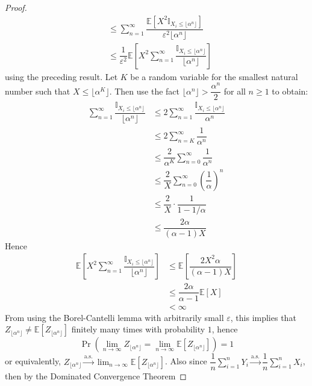 \documentclass[11pt]{report} %
\begin{document}
\begin{proof}
\begin{align}
&\leq \sum_{n = 1}^{\infty}\dfrac{\mathbb{E}\left[X^{2}\mathbb{I}_{X_{i} \leq \lfloor \alpha^{n} \rfloor}\right]}{\varepsilon^{2}\lfloor \alpha^{n} \rfloor} \\
&\leq \dfrac{1}{\varepsilon^{2}}\mathbb{E}\left[X^{2}\sum_{n = 1}^{\infty}\dfrac{\mathbb{I}_{X_{i} \leq \lfloor \alpha^{n} \rfloor}}{\lfloor \alpha^{n} \rfloor}\right]
\end{align}
using the preceding result. Let $K$ be a random variable for the smallest natural number such that $X \leq \lfloor \alpha^{K} \rfloor$. Then use the fact $\lfloor \alpha^{n} \rfloor > \dfrac{\alpha^{n}}{2}$ for all $n \geq 1$ to obtain:
\begin{align}
\sum_{n = 1}^{\infty}\dfrac{\mathbb{I}_{X_{i} \leq \lfloor \alpha^{n} \rfloor}}{\lfloor \alpha^{n} \rfloor} &\leq 2\sum_{n = 1}^{\infty}\dfrac{\mathbb{I}_{X_{i} \leq \lfloor \alpha^{n} \rfloor}}{\alpha^{n}} \\
&\leq 2\sum_{n = K}^{\infty}\dfrac{1}{\alpha^{n}} \\
&\leq \dfrac{2}{\alpha^{K}}\sum_{n = 0}^{\infty}\dfrac{1}{\alpha^{n}} \\
&\leq \dfrac{2}{X}\sum_{n = 0}^{\infty}\left(\dfrac{1}{\alpha}\right)^{n} \\
&\leq \dfrac{2}{X}\cdot\dfrac{1}{1 - 1/\alpha} \\
&\leq \dfrac{2\alpha}{\left(\alpha - 1\right)X}
\end{align}
Hence
\begin{align}
\mathbb{E}\left[X^{2}\sum_{n = 1}^{\infty}\dfrac{\mathbb{I}_{X_{i} \leq \lfloor \alpha^{n} \rfloor}}{\lfloor \alpha^{n} \rfloor}\right] &\leq \mathbb{E}\left[\dfrac{2X^{2}\alpha}{\left(\alpha - 1\right)X}\right] \\
&\leq \dfrac{2\alpha}{\alpha - 1}\mathbb{E}\left[X\right] \\
&< \infty
\end{align}
From using the Borel-Cantelli lemma with arbitrarily small $\varepsilon$, this implies that $Z_{\lfloor \alpha^{n} \rfloor} \neq \mathbb{E}\left[Z_{\lfloor \alpha^{n} \rfloor}\right]$ finitely many times with probability $1$, hence
\begin{equation}
\operatorname{Pr}\left(\lim_{n\to\infty}Z_{\lfloor \alpha^{n} \rfloor} = \lim_{n\to\infty}\mathbb{E}\left[Z_{\lfloor \alpha^{n} \rfloor}\right]\right) = 1
\end{equation}
or equivalently, $Z_{\lfloor \alpha^{n} \rfloor} \overset{\mathrm{a.s.}}{\to} \lim_{n\to\infty}\mathbb{E}\left[Z_{\lfloor \alpha^{n} \rfloor}\right]$. Also since $\dfrac{1}{n}\sum_{i = 1}^{n}Y_{i} \overset{\mathrm{a.s.}}{\to}  \dfrac{1}{n}\sum_{i = 1}^{n}X_{i}$, then by the Dominated Convergence Theorem

\end{proof}
\end{document}
